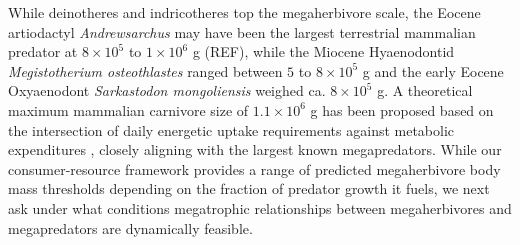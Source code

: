 \documentclass[11pt]{article}
\begin{document}

While deinotheres and indricotheres top the megaherbivore scale, the Eocene artiodactyl \emph{Andrewsarchus} may have been the largest terrestrial mammalian predator at $8\times10^5$ to $1\times10^6$ g (REF), while the Miocene Hyaenodontid \emph{Megistotherium osteothlastes} ranged between $5$ to $8\times10^5$ g \citep{sorkin2008biomechanical} and the early Eocene Oxyaenodont \emph{Sarkastodon mongoliensis} weighed ca. $8\times10^5$ g. %
A theoretical maximum mammalian carnivore size of $1.1\times10^6$ g has been proposed based on the intersection of daily energetic uptake requirements against metabolic expenditures \citep{Carbone:2007dz}, closely aligning with the largest known megapredators.
While our consumer-resource framework provides a range of predicted megaherbivore body mass thresholds depending on the fraction of predator growth it fuels, we next ask under what conditions megatrophic relationships between megaherbivores and megapredators are dynamically feasible.
\end{document}

